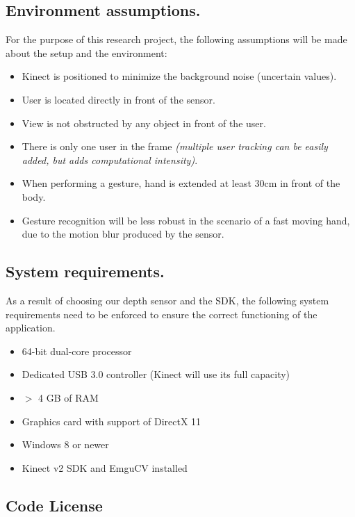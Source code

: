 \documentclass[a4paper,11pt,oneside]{article}
\begin{document}
\subsection{Environment assumptions.}

For the purpose of this research project, the following assumptions will be made about the setup and the environment:\\

\begin{itemize}
\item Kinect is positioned to minimize the background noise (uncertain values).
\item User is located directly in front of the sensor.
\item View is not obstructed by any object in front of the user.
\item There is only one user in the frame \textit{(multiple user tracking can be easily added, but adds computational intensity)}.
\item When performing a gesture, hand is extended at least 30cm in front of the body.
\item Gesture recognition will be less robust in the scenario of a fast moving hand, due to the motion blur produced by the sensor.
\end{itemize}

\subsection{System requirements.}

As a result of choosing our depth sensor and the SDK, the following system requirements need to be enforced to ensure the correct functioning of the application.

\begin{itemize}
\item 64-bit dual-core processor
\item Dedicated USB 3.0 controller (Kinect will use its full capacity)
\item $>$ 4 GB of RAM
\item Graphics card with support of DirectX 11
\item Windows 8 or newer
\item Kinect v2 SDK and EmguCV installed
\end{itemize}

\subsection{Code License}
\end{document}
